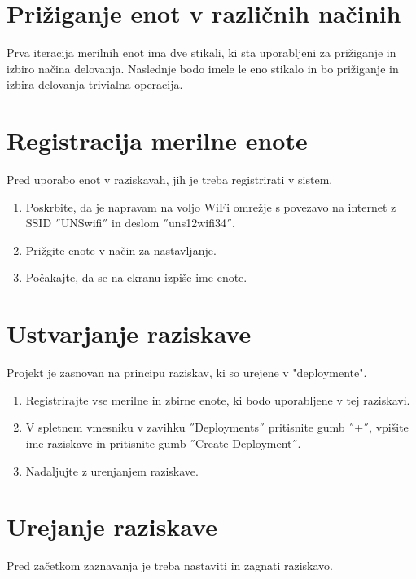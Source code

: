 \documentclass[a4paper, 12pt]{book}
\begin{document}
\section{Prižiganje enot v različnih načinih}

Prva iteracija merilnih enot ima dve stikali, ki sta uporabljeni za prižiganje in izbiro načina delovanja. Naslednje bodo imele le eno stikalo in bo prižiganje in izbira delovanja trivialna operacija.







\section{Registracija merilne enote}

Pred uporabo enot v raziskavah, jih je treba registrirati v sistem.

\begin{enumerate}
    \item Poskrbite, da je napravam na voljo WiFi omrežje s povezavo na internet z SSID ˝UNSwifi˝ in deslom ˝uns12wifi34˝.
    \item Prižgite enote v način za nastavljanje.
    \item Počakajte, da se na ekranu izpiše ime enote.
\end{enumerate}


\section{Ustvarjanje raziskave}

Projekt je zasnovan na principu raziskav, ki so urejene v "deploymente".

\begin{enumerate}
    \item Registrirajte vse merilne in zbirne enote, ki bodo uporabljene v tej raziskavi.
    \item V spletnem vmesniku v zavihku ˝Deployments˝ pritisnite gumb ˝+˝, vpišite ime raziskave in pritisnite gumb ˝Create Deployment˝.
    \item Nadaljujte z urenjanjem raziskave.
\end{enumerate}


\section{Urejanje raziskave}

Pred začetkom zaznavanja je treba nastaviti in zagnati raziskavo.
\end{document}
